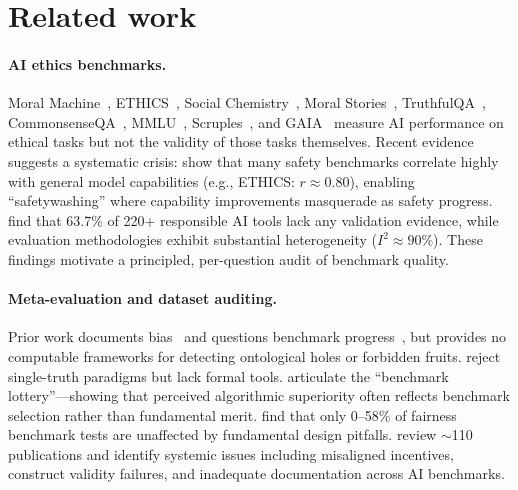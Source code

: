 \documentclass[11pt]{article}
\begin{document}


\section{Related work}
\label{sec:related}

\paragraph{AI ethics benchmarks.} Moral Machine~\citep{awad2018moral}, ETHICS~\citep{hendrycks2021ethics}, Social Chemistry~\citep{forbes2020social}, Moral Stories~\citep{emelin2021moral}, TruthfulQA~\citep{lin2021truthfulqa}, CommonsenseQA~\citep{talmor2019commonsenseqa}, MMLU~\citep{hendrycks2021mmlu}, Scruples~\citep{lourie2021scruples}, and GAIA~\citep{maia2024gaia} measure AI performance on ethical tasks but not the validity of those tasks themselves. Recent evidence suggests a systematic crisis: \citet{ren2024safetywashing} show that many safety benchmarks correlate highly with general model capabilities (e.g., ETHICS: $r \approx 0.80$), enabling ``safetywashing'' where capability improvements masquerade as safety progress. \citet{kuehnert2025responsible} find that 63.7\% of 220+ responsible AI tools lack any validation evidence, while evaluation methodologies exhibit substantial heterogeneity ($I^2 \approx 90\%$). These findings motivate a principled, per-question audit of benchmark quality.

\paragraph{Meta-evaluation and dataset auditing.} Prior work documents bias~\citep{hovy2021five,blodgett2020language} and questions benchmark progress~\citep{bowman2021will}, but provides no computable frameworks for detecting ontological holes or forbidden fruits. \citet{aroyo2015truth} reject single-truth paradigms but lack formal tools. \citet{dehghani2021benchmark} articulate the ``benchmark lottery''---showing that perceived algorithmic superiority often reflects benchmark selection rather than fundamental merit. \citet{blodgett2021stereotyping} find that only 0--58\% of fairness benchmark tests are unaffected by fundamental design pitfalls. \citet{eriksson2025trust} review $\sim$110 publications and identify systemic issues including misaligned incentives, construct validity failures, and inadequate documentation across AI benchmarks.
\end{document}
